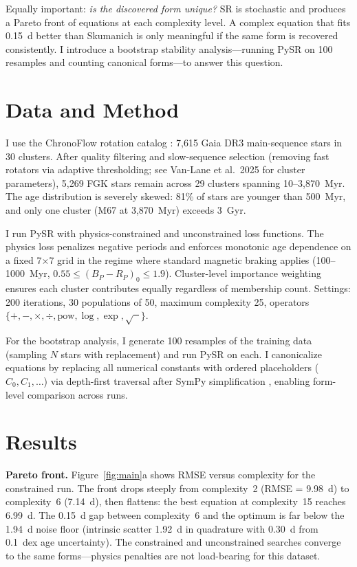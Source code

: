 \documentclass[RNAAS]{aastex7}
\begin{document}
Equally important: \emph{is the discovered form unique?}
SR is stochastic and produces a Pareto front of equations at each complexity level.
A complex equation that fits 0.15~d better than Skumanich is only meaningful if the same form is recovered consistently.
I introduce a bootstrap stability analysis---running PySR on 100 resamples and counting canonical forms---to answer this question.

\section{Data and Method}

I use the ChronoFlow rotation catalog \citep{VanLane2025}: 7,615 Gaia DR3 main-sequence stars in 30 clusters.
After quality filtering and slow-sequence selection (removing fast rotators via adaptive thresholding; see Van-Lane et al.\ 2025 for cluster parameters), 5,269 FGK stars remain across 29 clusters spanning 10--3,870~Myr.
The age distribution is severely skewed: 81\% of stars are younger than 500~Myr, and only one cluster (M67 at 3,870~Myr) exceeds 3~Gyr.

I run PySR with physics-constrained and unconstrained loss functions.
The physics loss penalizes negative periods and enforces monotonic age dependence on a fixed 7$\times$7 grid in the regime where standard magnetic braking applies (100--1000~Myr, $0.55 \leq (B_P - R_P)_0 \leq 1.9$).
Cluster-level importance weighting ensures each cluster contributes equally regardless of membership count.
Settings: 200 iterations, 30 populations of 50, maximum complexity 25, operators $\{+, -, \times, \div, \mathrm{pow}, \log, \exp, \sqrt{\phantom{x}}\}$.

For the bootstrap analysis, I generate 100 resamples of the training data (sampling $N$ stars with replacement) and run PySR on each.
I canonicalize equations by replacing all numerical constants with ordered placeholders ($C_0, C_1, \ldots$) via depth-first traversal after SymPy simplification \citep{Meurer2017}, enabling form-level comparison across runs.

\section{Results}

\textbf{Pareto front.}
Figure~\ref{fig:main}a shows RMSE versus complexity for the constrained run.
The front drops steeply from complexity~2 (RMSE = 9.98~d) to complexity~6 (7.14~d), then flattens: the best equation at complexity~15 reaches 6.99~d.
The 0.15~d gap between complexity~6 and the optimum is far below the 1.94~d noise floor (intrinsic scatter 1.92~d in quadrature with 0.30~d from 0.1~dex age uncertainty).
The constrained and unconstrained searches converge to the same forms---physics penalties are not load-bearing for this dataset.
\end{document}
